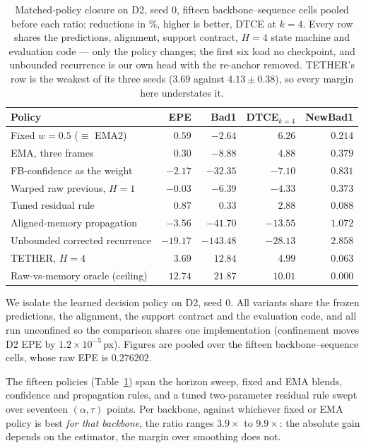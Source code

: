 \documentclass[letterpaper,10pt,conference]{ieeeconf}
\newcommand{\steer}{TETHER}
\begin{document}
\begin{table}[!ht]
\centering
\scriptsize
\caption{
Matched-policy closure on D2, seed $0$, fifteen backbone--sequence cells pooled
before each ratio; reductions in \%, higher is better, DTCE at $k{=}4$. Every
row shares the predictions, alignment, support contract, $H{=}4$ state machine
and evaluation code --- only the policy changes; the first six load no
checkpoint, and unbounded recurrence is our own head with the re-anchor
removed. \steer's row is the weakest of its three seeds ($3.69$ against
$4.13\pm0.38$), so every margin here understates it.
}
\label{tab:closure}
\setlength{\tabcolsep}{2.5pt}
\begin{tabular}{lrrrr}
\toprule
Policy & EPE & Bad1 & DTCE$_{k=4}$ & NewBad1 \\
\midrule
Fixed $w{=}0.5$ ($\equiv$ EMA2)   & $0.59$ & $-2.64$ & $6.26$ & $0.214$ \\
EMA, three frames                 & $0.30$ & $-8.88$ & $4.88$ & $0.379$ \\
FB-confidence as the weight       & $-2.17$ & $-32.35$ & $-7.10$ & $0.831$ \\
Warped raw previous, $H{=}1$      & $-0.03$ & $-6.39$ & $-4.33$ & $0.373$ \\
Tuned residual rule               & $0.87$ & $0.33$ & $2.88$ & $0.088$ \\
Aligned-memory propagation        & $-3.56$ & $-41.70$ & $-13.55$ & $1.072$ \\
Unbounded corrected recurrence    & $-19.17$ & $-143.48$ & $-28.13$ & $2.858$ \\
\midrule
\steer, $H{=}4$                   & $\mathbf{3.69}$ & $\mathbf{12.84}$ & $\mathbf{4.99}$ & $\mathbf{0.063}$ \\
\midrule
Raw-vs-memory oracle (ceiling)    & $12.74$ & $21.87$ & $10.01$ & $0.000$ \\
\bottomrule
\end{tabular}
\end{table}

We isolate the learned decision policy on D2, seed $0$. All variants share the
frozen predictions, the alignment, the support contract and the evaluation
code, and all run unconfined so the comparison shares one implementation
(confinement moves D2 EPE by $1.2\times10^{-5}$\,px). Figures are pooled over
the fifteen backbone--sequence cells, whose raw EPE is $0.276202$.

The fifteen policies (Table~\ref{tab:closure}) span the horizon sweep,
fixed and EMA blends, confidence and propagation rules, and a tuned
two-parameter residual rule swept over seventeen $(\alpha,\tau)$ points.
Per backbone, against whichever fixed or EMA policy is best \emph{for that
backbone}, the ratio ranges $3.9\times$ to $9.9\times$: the absolute gain
depends on the estimator, the margin over smoothing does not.
\end{document}
